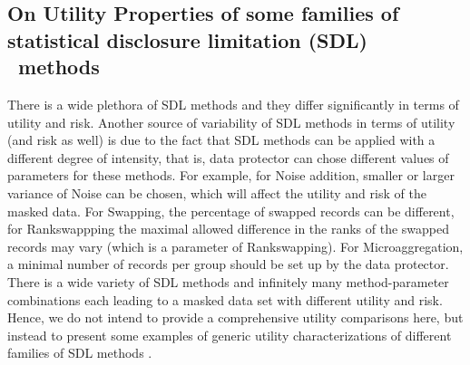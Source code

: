 \documentclass[12pt]{article}
\def\SDL{statistical disclosure limitation (SDL)%
    \gdef\SDL{SDL}}
\begin{document}

\subsection{On Utility Properties of some families of \SDL\ methods}
\label{subsec.simulateddata}

There is a wide plethora of SDL methods and they differ significantly in terms of utility  and risk. Another source of variability of SDL methods in terms of utility (and risk as well) is due to the fact that SDL methods can be applied with a different degree of intensity, that is, data protector can chose  different values of parameters for these methods. 
For example, for Noise addition, smaller or larger variance of Noise can be chosen, which will affect the utility and risk of the masked data. For Swapping, the percentage of swapped records can be different, for Rankswappping  the  maximal allowed difference in the ranks of the swapped records  may vary (which is a parameter of Rankswapping). For Microaggregation, a minimal number of records per group should be set up by the data protector.  There is a wide variety of SDL methods and  infinitely many method-parameter combinations each leading to a masked data set with different utility and risk. Hence, we do not intend to provide a comprehensive utility comparisons here, but instead to present some examples of generic utility characterizations of different families of SDL methods . 
\end{document}
